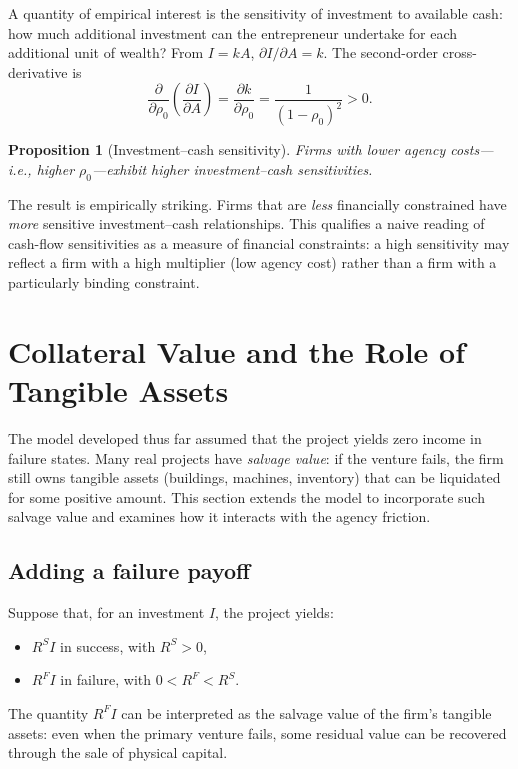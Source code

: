 \documentclass[11pt,a4paper,oneside]{book}
\theoremstyle{plain}
\newtheorem{proposition}[theorem]{Proposition}
\theoremstyle{definition}
\theoremstyle{remark}
\numberwithin{equation}{chapter}
\begin{document}
A quantity of empirical interest is the sensitivity of investment to available cash: how much additional investment can the entrepreneur undertake for each additional unit of wealth?
From $I = k A$, $\partial I / \partial A = k$.
The second-order cross-derivative is
\begin{equation}\label{eq:EM-cross-derivative}
  \frac{\partial}{\partial \rho_0} \left( \frac{\partial I}{\partial A} \right) = \frac{\partial k}{\partial \rho_0} = \frac{1}{(1 - \rho_0)^2} > 0.
\end{equation}

\begin{proposition}[Investment--cash sensitivity]\label{prop:EM-cash-sensitivity}
Firms with lower agency costs---i.e., higher $\rho_0$---exhibit higher investment--cash sensitivities.
\end{proposition}

The result is empirically striking.
Firms that are \emph{less} financially constrained have \emph{more} sensitive investment--cash relationships.
This qualifies a naive reading of cash-flow sensitivities as a measure of financial constraints: a high sensitivity may reflect a firm with a high multiplier (low agency cost) rather than a firm with a particularly binding constraint.

\section{Collateral Value and the Role of Tangible Assets}
\label{sec:EM-collateral}

The model developed thus far assumed that the project yields zero income in failure states.
Many real projects have \emph{salvage value}: if the venture fails, the firm still owns tangible assets (buildings, machines, inventory) that can be liquidated for some positive amount.
This section extends the model to incorporate such salvage value and examines how it interacts with the agency friction.

\subsection{Adding a failure payoff}

Suppose that, for an investment $I$, the project yields:
\begin{itemize}
  \item $R^S I$ in success, with $R^S > 0$,
  \item $R^F I$ in failure, with $0 < R^F < R^S$.
\end{itemize}
The quantity $R^F I$ can be interpreted as the salvage value of the firm's tangible assets: even when the primary venture fails, some residual value can be recovered through the sale of physical capital.
\end{document}
